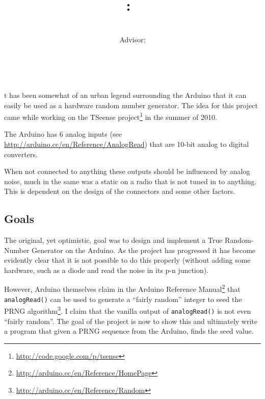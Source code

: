 \documentclass[a4paper]{article}           %
\title{
    \Class:\ \Title
    \ifthenelse{\equal{\SubTitle}{}}{}{\\{\SubTitle}}
    }
\date{\small{\DueLang\ \DueDate}}
\author{\AuthorName\\Advisor: \ClassInstructor}
\newcommand{\tmpsection}[1]{}
\let\tmpsection=\section
\renewcommand{\section}[2]{

    \ifthenelse{
      \equal{#2}{Heimildir} %
    }
    {
      \tmpsection{\sc{#1} }
      \tmpsection{\sc{#2} }
    }
    {\tmpsection{\sc{#1} } }
      

}
\begin{document}
\maketitle



\section{Introduction}

It has been somewhat of an urban legend surrounding the Arduino that it can easily be used as a hardware random number generator. The idea for this project came while working on the TSeense project\footnote{\url{http://code.google.com/p/tsense}} in the summer of 2010. 

The Arduino has 6 analog inputs (see \url{http://arduino.cc/en/Reference/AnalogRead}) that are 10-bit analog to digital converters. 

When not connected to anything these outputs should be influenced by analog noise, much in the same was a static on a radio that is not tuned in to anything. This is dependent on the design of the connectors and some other factors. 

\subsection{Goals}

The original, yet optimistic, goal was to design and implement a True Random-Number Generator on the Arduino. As the project has progressed it has become evidently clear that it is not possible to do this properly (without adding some hardware, such as a diode and read the noise in its p-n junction). 

However, Arduino themselves claim in the Arduino Reference Manual\footnote{\url{http://arduino.cc/en/Reference/HomePage}} that \texttt{analogRead()} can be used to generate a ``fairly random'' integer to seed the PRNG algorithm\footnote{\url{http://arduino.cc/en/Reference/Random}}. I claim that the vanilla output of \texttt{analogRead()} is not even ``fairly random''. The goal of the project is now to show this and ultimately write a program that given a PRNG sequence from the Arduino, finds the seed value. 
\end{document}
